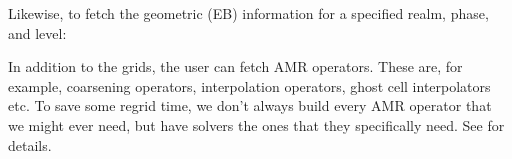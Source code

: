 \documentclass[letterpaper,10pt,english]{sphinxmanual}
\begin{document}
Likewise, to fetch the geometric (EB) information for a specified realm, phase, and level:

\begin{sphinxVerbatim}[commandchars=\\\{\},formatcom=\scriptsize]
  
  
  

     \PYG{p}{[}\PYG{p}{]}
\end{sphinxVerbatim}

In addition to the grids, the user can fetch AMR operators.
These are, for example, coarsening operators, interpolation operators, ghost cell interpolators etc.
To save some regrid time, we don’t always build every AMR operator that we might ever need, but have solvers  the ones that they specifically need.
See {\hyperref[\detokenize{Source/Realm:chap-realm}]{}} for details.
\end{document}
